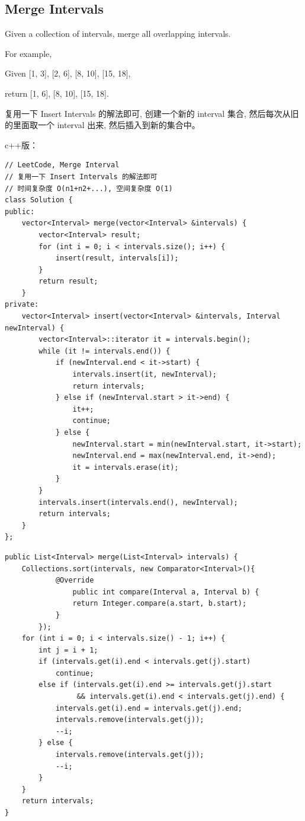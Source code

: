 \documentclass[12pt]{book}
\begin{document}
\subsection{Merge Intervals}
\label{sec-20-1-6}
Given a collection of intervals, merge all overlapping intervals.

For example,

Given [1, 3], [2, 6], [8, 10], [15, 18], 

return [1, 6], [8, 10], [15, 18].

复用一下 Insert Intervals 的解法即可, 创建一个新的 interval 集合, 然后每次从旧的里面取一个
interval 出来, 然后插入到新的集合中。

c++版：

\lstset{language=java,label= ,caption= ,numbers=none}
\begin{lstlisting}
// LeetCode, Merge Interval
// 复用一下 Insert Intervals 的解法即可
// 时间复杂度 O(n1+n2+...), 空间复杂度 O(1)
class Solution {
public:
    vector<Interval> merge(vector<Interval> &intervals) {
        vector<Interval> result;
        for (int i = 0; i < intervals.size(); i++) {
            insert(result, intervals[i]);
        }
        return result;
    }
private:
    vector<Interval> insert(vector<Interval> &intervals, Interval newInterval) {
        vector<Interval>::iterator it = intervals.begin();
        while (it != intervals.end()) {
            if (newInterval.end < it->start) {
                intervals.insert(it, newInterval);
                return intervals;
            } else if (newInterval.start > it->end) {
                it++;
                continue;
            } else {
                newInterval.start = min(newInterval.start, it->start);
                newInterval.end = max(newInterval.end, it->end);
                it = intervals.erase(it);
            }
        }
        intervals.insert(intervals.end(), newInterval);
        return intervals;
    }
};
\end{lstlisting}

\lstset{language=java,label= ,caption= ,numbers=none}
\begin{lstlisting}
public List<Interval> merge(List<Interval> intervals) {
    Collections.sort(intervals, new Comparator<Interval>(){
            @Override
                public int compare(Interval a, Interval b) {
                return Integer.compare(a.start, b.start);
            }
        });
    for (int i = 0; i < intervals.size() - 1; i++) {
        int j = i + 1;
        if (intervals.get(i).end < intervals.get(j).start)
            continue;
        else if (intervals.get(i).end >= intervals.get(j).start
                 && intervals.get(i).end < intervals.get(j).end) {
            intervals.get(i).end = intervals.get(j).end;
            intervals.remove(intervals.get(j));
            --i;
        } else {
            intervals.remove(intervals.get(j));
            --i;
        }
    }
    return intervals;
}
\end{lstlisting}
\end{document}

